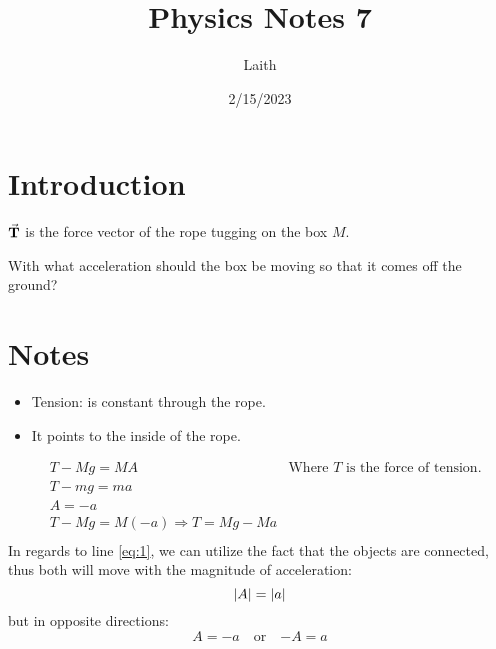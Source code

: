 \documentclass[12pt]{article}
\title{Physics Notes 7}
\date{2/15/2023}
\author{Laith}
\begin{document}
\maketitle

\section{Introduction}

$\va{T}$ is the force vector of the rope tugging on the box $M$. 
\begin{figure}[h]
    \centering
\end{figure}

\noindent With what acceleration should the box be 
moving so that it comes off the ground?

\newpage
\section{Notes}
\begin{itemize}
    \item Tension: is constant through the rope.
    \item It points to the inside of the rope.
\end{itemize}

\begin{figure}[h]
    \centering
\end{figure}
\begin{subequations}
    \begin{align}
        &T-Mg = MA  &\text{Where $T$ is the force of tension.} \\
        &T-mg = ma \\ 
        &A = -a \label{eq:1} \\
        &T - Mg = M(-a) \Rightarrow T=Mg-Ma \\
    \end{align}
\end{subequations}
In regards to line \ref{eq:1}, we can utilize the fact that 
the objects are connected, thus both will move with the
magnitude of acceleration:
\[ \abs{A} = \abs{a} \] 
but in opposite directions:
\[ \boxed{A = -a} \quad \mathrm{or} \quad \boxed{-A = a} \]
\end{document}
